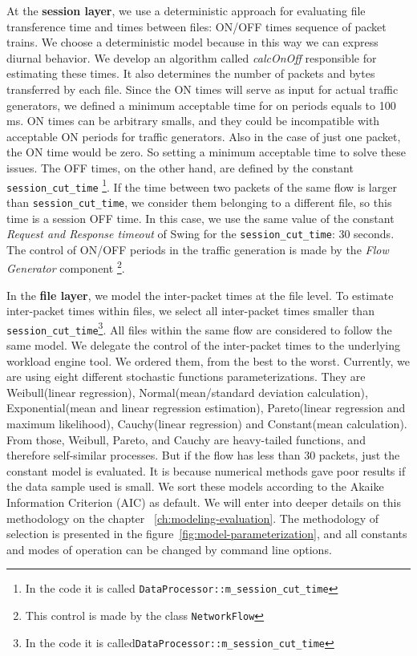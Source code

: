 At the \textbf{session layer}, we use a deterministic approach for evaluating file transference time and times between files: ON/OFF times sequence of packet trains. We choose a deterministic model because in this way we can express diurnal behavior\cite{harpoon-validation}.  We develop an algorithm called \textit{calcOnOff} responsible for estimating these times. It also determines the number of packets and bytes transferred by each file. Since the ON times will serve as input for actual traffic generators, we defined a minimum acceptable time for on periods equals to 100 ms. ON times can be arbitrary smalls, and they could be incompatible with acceptable ON periods for traffic generators. Also in the case of just one packet, the ON time would be zero. So setting a minimum acceptable time to solve these issues. The OFF times, on the other hand, are defined by the constant \texttt{session\_cut\_time} \footnote{In the code it is called \texttt{DataProcessor::m\_session\_cut\_time} }. If the time between two packets of the same flow is larger than \texttt{session\_cut\_time}, we consider them belonging to a different file, so this time is a session OFF time. In this case, we use the same value of the constant \textit{Request and Response timeout} of Swing\cite{swing-paper} for the \texttt{session\_cut\_time}: 30 seconds. The control of ON/OFF periods in the traffic generation is made by the \textit{Flow Generator} component \footnote{This control is made by the class \texttt{NetworkFlow}}.


In the \textbf{file layer}, we model the inter-packet times at the file level. To estimate inter-packet times within files, we select all inter-packet times smaller than \texttt{session\_cut\_time}\footnote{In the code it is called\texttt{DataProcessor::m\_session\_cut\_time} }. All files within the same flow are considered to follow the same model. We delegate the control of the inter-packet times to the underlying workload engine tool. We ordered them, from the best to the worst. Currently, we are using eight different stochastic functions parameterizations. They are Weibull(linear regression), Normal(mean/standard deviation calculation), Exponential(mean and linear regression estimation), Pareto(linear regression and maximum likelihood), Cauchy(linear regression) and Constant(mean calculation). From those, Weibull, Pareto, and Cauchy are heavy-tailed functions, and therefore self-similar processes. But if the flow has less than 30 packets, just the constant model is evaluated. It is because numerical methods gave poor results if the data sample used is small. We sort these models according to the Akaike Information Criterion (AIC) as default\cite{sourcesonoff-paper}\cite{bic-aic-comparision}. We will enter into deeper details on this methodology on the chapter ~\ref{ch:modeling-evaluation}. The methodology of selection is presented in the figure~\ref{fig:model-parameterization}, and all constants and modes of operation can be changed by command line options.


